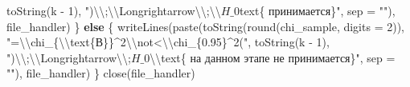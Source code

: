 \documentclass[
]{article}
\newenvironment{Shaded}{\begin{snugshade}}{\end{snugshade}}
\newcommand{\AttributeTok}[1]{\textcolor[rgb]{0.77,0.63,0.00}{#1}}
\newcommand{\ControlFlowTok}[1]{\textcolor[rgb]{0.13,0.29,0.53}{\textbf{#1}}}
\newcommand{\DecValTok}[1]{\textcolor[rgb]{0.00,0.00,0.81}{#1}}
\newcommand{\FunctionTok}[1]{\textcolor[rgb]{0.00,0.00,0.00}{#1}}
\newcommand{\NormalTok}[1]{#1}
\newcommand{\SpecialCharTok}[1]{\textcolor[rgb]{0.00,0.00,0.00}{#1}}
\newcommand{\StringTok}[1]{\textcolor[rgb]{0.31,0.60,0.02}{#1}}
\begin{document}
\begin{Shaded}
\begin{Highlighting}[]
        \FunctionTok{toString}\NormalTok{(k }\SpecialCharTok{{-}} \DecValTok{1}\NormalTok{), }\StringTok{")}\SpecialCharTok{\textbackslash{}\textbackslash{}}\StringTok{;}\SpecialCharTok{\textbackslash{}\textbackslash{}}\StringTok{Longrightarrow}\SpecialCharTok{\textbackslash{}\textbackslash{}}\StringTok{;}\SpecialCharTok{\textbackslash{}\textbackslash{}}\StringTok{$H\_0$text\{ принимается\}"}\NormalTok{, }\AttributeTok{sep =} \StringTok{""}\NormalTok{), }
\NormalTok{        file\_handler)}
\NormalTok{\} }\ControlFlowTok{else}\NormalTok{ \{}
    \FunctionTok{writeLines}\NormalTok{(}\FunctionTok{paste}\NormalTok{(}\FunctionTok{toString}\NormalTok{(}\FunctionTok{round}\NormalTok{(chi\_sample, }\AttributeTok{digits =} \DecValTok{2}\NormalTok{)), }\StringTok{"=}\SpecialCharTok{\textbackslash{}\textbackslash{}}\StringTok{chi\_\{}\SpecialCharTok{\textbackslash{}\textbackslash{}}\StringTok{text\{В\}\}\^{}2}\SpecialCharTok{\textbackslash{}\textbackslash{}}\StringTok{not\textless{}}\SpecialCharTok{\textbackslash{}\textbackslash{}}\StringTok{chi\_\{0.95\}\^{}2("}\NormalTok{, }
        \FunctionTok{toString}\NormalTok{(k }\SpecialCharTok{{-}} \DecValTok{1}\NormalTok{), }\StringTok{")}\SpecialCharTok{\textbackslash{}\textbackslash{}}\StringTok{;}\SpecialCharTok{\textbackslash{}\textbackslash{}}\StringTok{Longrightarrow}\SpecialCharTok{\textbackslash{}\textbackslash{}}\StringTok{;$H\_0$}\SpecialCharTok{\textbackslash{}\textbackslash{}}\StringTok{text\{ на данном этапе не принимается\}"}\NormalTok{, }
        \AttributeTok{sep =} \StringTok{""}\NormalTok{), file\_handler)}
\NormalTok{\}}
\FunctionTok{close}\NormalTok{(file\_handler)}
\end{Highlighting}
\end{Shaded}
\end{document}
